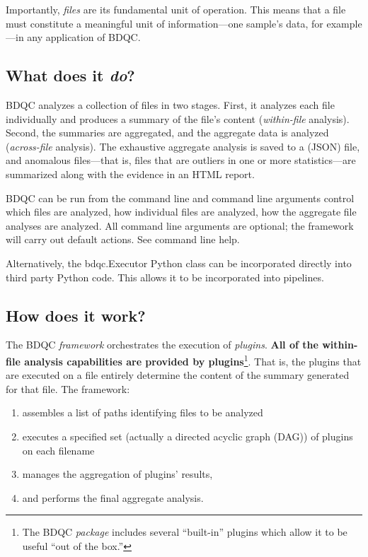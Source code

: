 \documentclass {article}
\begin{document}
Importantly, \emph{files} are its fundamental unit of operation.
This means that a file must constitute a meaningful unit of
information---one sample's data, for example---in any application of BDQC. %

\subsection{What does it \emph{do}?}

BDQC analyzes a collection of files in two stages.
First, it analyzes each file individually and produces a summary of the
file's content (\emph{within-file} analysis). Second, the summaries are
aggregated, and the aggregate data is analyzed (\emph{across-file}
analysis). The exhaustive aggregate analysis is saved to a (JSON) file,
and anomalous files---that is, files that are outliers in one or more
statistics---are summarized along with the evidence in an HTML report. 

BDQC can be run from the command line and command line arguments control
which files are analyzed,
how individual files are analyzed,
how the aggregate file analyses are analyzed.
All command line arguments are optional; the framework will carry out
default actions. See command line help.

Alternatively, the bdqc.Executor Python class can be incorporated directly
into third party Python code. This allows it to be incorporated into
pipelines.

\subsection{How does it work?}

The BDQC \emph{framework} orchestrates the execution of \emph{plugins}.
{\bf All of the within-file analysis capabilities are provided by
plugins}\footnote{The BDQC \emph{package} includes several
``built-in'' plugins which allow it to be useful ``out of the box.''}.
That is, the plugins that are executed on a file entirely determine the
content of the summary generated for that file.
The framework:
\begin{enumerate}
\item assembles a list of paths identifying files to be analyzed
\item executes a specified set (actually a directed acyclic graph (DAG))
		of plugins on each filename
\item manages the aggregation of plugins' results,
\item and performs the final aggregate analysis.
\end{enumerate}
\end{document}
